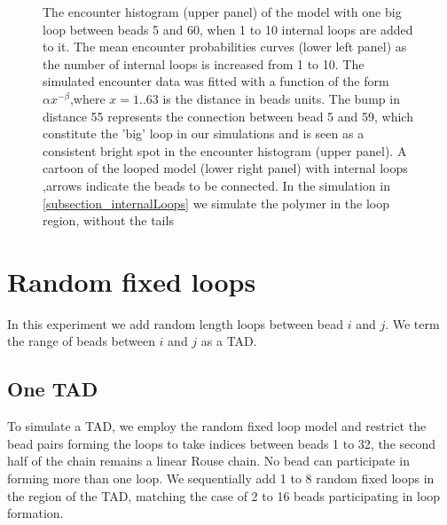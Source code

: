 \documentclass[12pt]{book}
\begin{document}
\begin{figure}[H]
\caption{\scriptsize{The encounter histogram (upper panel) of the model with one big loop between beads 5 and 60, when 1 to 10 internal loops are added to it. The mean encounter probabilities curves (lower left panel) as the number of internal loops is increased from 1 to 10. The simulated encounter data was fitted with a function of the form $\alpha x^{-\beta}$,where $x=1..63$ is the distance in beads units. The bump in distance 55 represents the connection between bead 5 and 59, which constitute the 'big' loop in our simulations and is seen as a consistent bright spot in the encounter histogram (upper panel). A cartoon of the looped model (lower right panel) with internal loops ,arrows indicate the beads to be connected. In the simulation in \ref{subsection_internalLoops} we simulate the polymer in the loop region, without the tails}}
\label{figure_encounterHistogram1To10InternalLoops}
\end{figure}


\section{Random fixed loops}\label{section_RandomFixedLoops}
In this experiment we add random length loops between bead $i$ and $j$. We term the range of beads between $i$ and $j$ as a TAD. 

\subsection{One TAD}
To simulate a TAD, we employ the random fixed loop model and restrict the bead pairs forming the loops to take indices between beads 1 to 32, the second half of the chain remains a linear Rouse chain. No bead can participate in forming more than one loop. 
We sequentially add 1 to 8 random fixed loops in the region of the TAD, matching the case of 2 to 16 beads participating in loop formation. 
\end{document}
